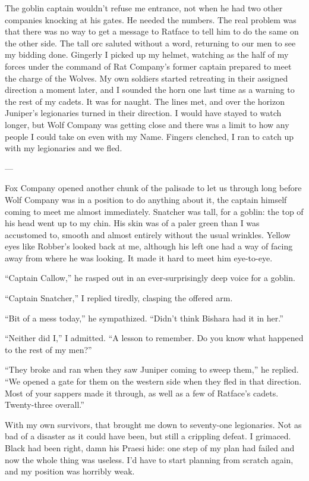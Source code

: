 \documentclass[12pt, openany]{book}
\begin{document}
The goblin captain wouldn’t refuse me entrance, not when he had two other companies knocking at his gates. He needed the numbers. The real problem was that there was no way to get a message to Ratface to tell him to do the same on the other side. The tall orc saluted without a word, returning to our men to see my bidding done. Gingerly I picked up my helmet, watching as the half of my forces under the command of Rat Company’s former captain prepared to meet the charge of the Wolves. My own soldiers started retreating in their assigned direction a moment later, and I sounded the horn one last time as a warning to the rest of my cadets. It was for naught. The lines met, and over the horizon Juniper’s legionaries turned in their direction. I would have stayed to watch longer, but Wolf Company was getting close and there was a limit to how any people I could take on even with my Name. Fingers clenched, I ran to catch up with my legionaries and we fled.

—

Fox Company opened another chunk of the palisade to let us through long before Wolf Company was in a position to do anything about it, the captain himself coming to meet me almost immediately. Snatcher was tall, for a goblin: the top of his head went up to my chin. His skin was of a paler green than I was accustomed to, smooth and almost entirely without the usual wrinkles. Yellow eyes like Robber’s looked back at me, although his left one had a way of facing away from where he was looking. It made it hard to meet him eye-to-eye.

“Captain Callow,” he rasped out in an ever-surprisingly deep voice for a goblin.

“Captain Snatcher,” I replied tiredly, clasping the offered arm.

“Bit of a mess today,” he sympathized. “Didn’t think Bishara had it in her.”

“Neither did I,” I admitted. “A lesson to remember. Do you know what happened to the rest of my men?”

“They broke and ran when they saw Juniper coming to sweep them,” he replied. “We opened a gate for them on the western side when they fled in that direction. Most of your sappers made it through, as well as a few of Ratface’s cadets. Twenty-three overall.”

With my own survivors, that brought me down to seventy-one legionaries. Not as bad of a disaster as it could have been, but still a crippling defeat. I grimaced. Black had been right, damn his Praesi hide: one step of my plan had failed and now the whole thing was useless. I’d have to start planning from scratch again, and my position was horribly weak.
\end{document}

